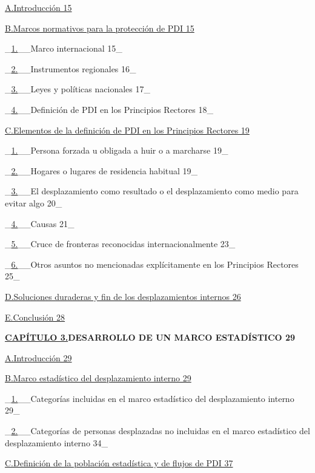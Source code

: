 \documentclass[
]{book}
\begin{document}
\protect\hyperlink{_Toc71834740}{A.Introducción 15}

\protect\hyperlink{_Toc71834741}{B.Marcos normativos para la protección de PDI 15}

\_\protect\hyperlink{_Toc71834742}{1.}\_\_Marco internacional 15\_

\_\protect\hyperlink{_Toc71834743}{2.}\_\_Instrumentos regionales 16\_

\_\protect\hyperlink{_Toc71834744}{3.}\_\_Leyes y políticas nacionales 17\_

\_\protect\hyperlink{_Toc71834745}{4.}\_\_Definición de PDI en los Principios Rectores 18\_

\protect\hyperlink{_Toc71834746}{C.Elementos de la definición de PDI en los Principios Rectores 19}

\_\protect\hyperlink{_Toc71834747}{1.}\_\_Persona forzada u obligada a huir o a marcharse 19\_

\_\protect\hyperlink{_Toc71834748}{2.}\_\_Hogares o lugares de residencia habitual 19\_

\_\protect\hyperlink{_Toc71834749}{3.}\_\_El desplazamiento como resultado o el desplazamiento como medio para evitar algo 20\_

\_\protect\hyperlink{_Toc71834750}{4.}\_\_Causas 21\_

\_\protect\hyperlink{_Toc71834751}{5.}\_\_Cruce de fronteras reconocidas internacionalmente 23\_

\_\protect\hyperlink{_Toc71834752}{6.}\_\_Otros asuntos no mencionadas explícitamente en los Principios Rectores 25\_

\protect\hyperlink{_Toc71834753}{D.Soluciones duraderas y fin de los desplazamientos internos 26}

\protect\hyperlink{_Toc71834754}{E.Conclusión 28}

\textbf{\protect\hyperlink{_Toc71834755}{CAPÍTULO 3.}DESARROLLO DE UN MARCO ESTADÍSTICO 29}

\protect\hyperlink{_Toc71834756}{A.Introducción 29}

\protect\hyperlink{_Toc71834757}{B.Marco estadístico del desplazamiento interno 29}

\_\protect\hyperlink{_Toc71834758}{1.}\_\_Categorías incluidas en el marco estadístico del desplazamiento interno 29\_

\_\protect\hyperlink{_Toc71834759}{2.}\_\_Categorías de personas desplazadas no incluidas en el marco estadístico del desplazamiento interno 34\_

\protect\hyperlink{_Toc71834760}{C.Definición de la población estadística y de flujos de PDI 37}
\end{document}
